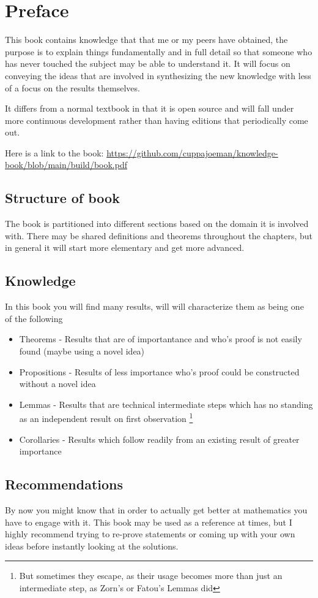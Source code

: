 \chapter*{Preface}
This book contains knowledge that that me or my peers have obtained, the purpose is to explain things fundamentally and in full detail so that someone who has never touched the subject may be able to understand it. It will focus on conveying the ideas that are involved in synthesizing the new knowledge with less of a focus on the results themselves.

It differs from a normal textbook in that it is open source and will fall under more continuous development rather than having editions that periodically come out.

Here is a link to the book: \url{https://github.com/cuppajoeman/knowledge-book/blob/main/build/book.pdf}


\section*{Structure of book}
The book is partitioned into different sections based on the domain it is involved with. There may be shared definitions and theorems throughout the chapters, but in general it will start more elementary and get more advanced.

\section*{Knowledge}
In this book you will find many results, will will characterize them as being one of the following
\begin{itemize}
    \item Theorems - Results that are of importantance and who's proof is not easily found (maybe using a novel idea)
  \item Propositions - Results of less importance who's proof could be constructed without a novel idea
  \item Lemmas - Results that are technical intermediate steps which has no standing as an independent result on first observation \footnote{But sometimes they escape, as their usage becomes more than just an intermediate step,  as Zorn's or Fatou's Lemmas did}
    \item Corollaries - Results which follow readily  from an existing result of greater importance
\end{itemize}

\section*{Recommendations}
By now you might know that in order to actually get better at mathematics you have to engage with it. This book may be used as a reference at times, but I highly recommend trying to re-prove statements or coming up with your own ideas before instantly looking at the solutions.

